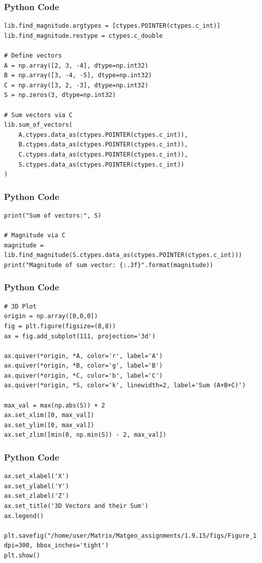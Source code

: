 \documentclass{beamer}
\begin{document}
\begin{frame}[fragile]
    \frametitle{Python Code}
    \begin{lstlisting}
lib.find_magnitude.argtypes = [ctypes.POINTER(ctypes.c_int)]
lib.find_magnitude.restype = ctypes.c_double

# Define vectors
A = np.array([2, 3, -4], dtype=np.int32)
B = np.array([3, -4, -5], dtype=np.int32)
C = np.array([3, 2, -3], dtype=np.int32)
S = np.zeros(3, dtype=np.int32)

# Sum vectors via C
lib.sum_of_vectors(
    A.ctypes.data_as(ctypes.POINTER(ctypes.c_int)),
    B.ctypes.data_as(ctypes.POINTER(ctypes.c_int)),
    C.ctypes.data_as(ctypes.POINTER(ctypes.c_int)),
    S.ctypes.data_as(ctypes.POINTER(ctypes.c_int))
)
    \end{lstlisting}
\end{frame}

\begin{frame}[fragile]
    \frametitle{Python Code}
    \begin{lstlisting}
print("Sum of vectors:", S)

# Magnitude via C
magnitude = lib.find_magnitude(S.ctypes.data_as(ctypes.POINTER(ctypes.c_int)))
print("Magnitude of sum vector: {:.3f}".format(magnitude))
    \end{lstlisting}
\end{frame}

\begin{frame}[fragile]
    \frametitle{Python Code}
    \begin{lstlisting}
# 3D Plot
origin = np.array([0,0,0])
fig = plt.figure(figsize=(8,8))
ax = fig.add_subplot(111, projection='3d')

ax.quiver(*origin, *A, color='r', label='A')
ax.quiver(*origin, *B, color='g', label='B')
ax.quiver(*origin, *C, color='b', label='C')
ax.quiver(*origin, *S, color='k', linewidth=2, label='Sum (A+B+C)')

max_val = max(np.abs(S)) + 2
ax.set_xlim([0, max_val])
ax.set_ylim([0, max_val])
ax.set_zlim([min(0, np.min(S)) - 2, max_val])
    \end{lstlisting}
\end{frame}
\begin{frame}[fragile]
    \frametitle{Python Code}
    \begin{lstlisting}
ax.set_xlabel('X')
ax.set_ylabel('Y')
ax.set_zlabel('Z')
ax.set_title('3D Vectors and their Sum')
ax.legend()

plt.savefig("/home/user/Matrix/Matgeo_assignments/1.9.15/figs/Figure_1.png", dpi=300, bbox_inches='tight')
plt.show()

    \end{lstlisting}
\end{frame}
\end{document}
